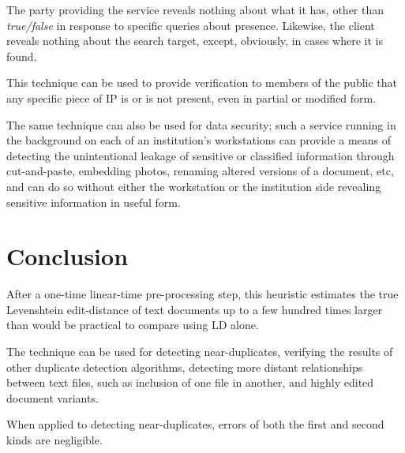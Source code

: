 \documentclass[html]{article}    %
\begin{document}
\begin{itemize}
{  		The party providing the service reveals nothing about what it has, other than {\em true/false} in response to specific queries about presence.
  		Likewise, the client reveals nothing about the search target, except, obviously, in cases where it is found. 
  		
  		This technique can be used to provide verification to members of the public that any specific piece of IP is or is not present, 
		even in partial or modified form.
  		
  		The same technique can also be used for data security; such a service running in the background on each of an institution's workstations can provide a
  		means of detecting the unintentional leakage of sensitive or classified information through cut-and-paste, embedding photos, renaming altered
  		versions of a document, etc, and can do so without either the workstation or the institution side revealing sensitive information in useful form. 
  	}
\end{itemize}

\section{Conclusion}
After a one-time linear-time pre-processing step, this heuristic estimates the true Levenshtein edit-distance of text documents up to a few hundred times
larger than would be practical to compare using LD alone.

The technique can be used for detecting near-duplicates, verifying the results of other duplicate detection algorithms, detecting more 
distant relationships between text files, such as inclusion of one file in another, and highly edited document variants.

When applied to detecting near-duplicates, errors of both the first and second kinds are negligible.

% 
%
% 
\end{document}
